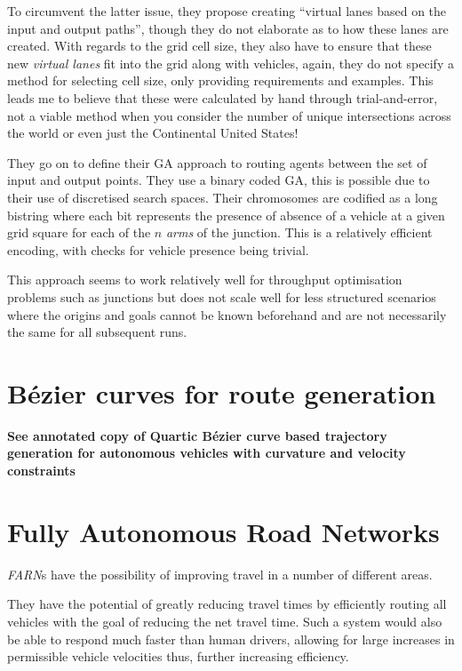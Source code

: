 To circumvent the latter issue, they propose creating ``virtual lanes based on the input and output paths'', though they do not elaborate as to how these lanes are created. With regards to the grid cell size, they also have to ensure that these new \textit{virtual lanes} fit into the grid along with vehicles, again, they do not specify a method for selecting cell size, only providing requirements and examples. This leads me to believe that these were calculated by hand through trial-and-error, not a viable method when you consider the number of unique intersections across the world or even just the Continental United States!

They go on to define their GA approach to routing agents between the set of input and output points. They use a binary coded GA, this is possible due to their use of discretised search spaces. Their chromosomes are codified as a long bistring where each bit represents the presence of absence of a vehicle at a given grid square for each of the $n$ \textit{arms} of the junction. This is a relatively efficient encoding, with checks for vehicle presence being trivial.

This approach seems to work relatively well for throughput optimisation problems such as junctions but does not scale well for less structured scenarios where the origins and goals cannot be known beforehand and are not necessarily the same for all subsequent runs.


\section{Bézier curves for route generation}

\textbf{See annotated copy of Quartic Bézier curve based trajectory generation for autonomous vehicles with curvature and velocity constraints \cite{chenQuarticBezierCurve2014}}

\section{Fully Autonomous Road Networks}

\textit{FARN}s have the possibility of improving travel in a number of different areas. 

They have the potential of greatly reducing travel times by efficiently routing all vehicles with the goal of reducing the net travel time. Such a system would also be able to respond much faster than human drivers, allowing for large increases in permissible vehicle velocities thus, further increasing efficiency.

